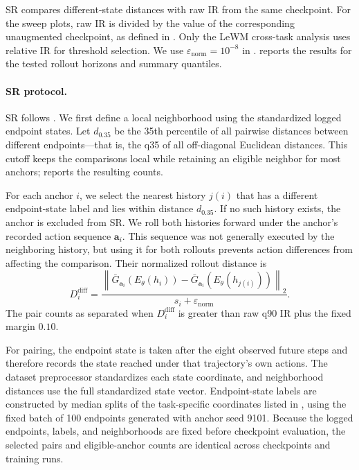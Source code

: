 \documentclass{article}
\begin{document}
SR compares different-state distances with raw IR from the same checkpoint.
For the sweep plots, raw IR is divided by the value of the corresponding
unaugmented checkpoint, as defined in . Only the LeWM
cross-task analysis uses relative IR for threshold selection. We use
$\varepsilon_{\mathrm{norm}}=10^{-8}$ in
.
 reports the results for the tested
rollout horizons and summary quantiles.



\paragraph{SR protocol.}
SR follows . We first define a local neighborhood using the
standardized logged endpoint states. Let $d_{0.35}$ be the 35th percentile of
all pairwise distances between different endpoints---that is, the q35 of all off-diagonal Euclidean distances.
This cutoff keeps the comparisons local while retaining an eligible neighbor for most anchors;
 reports the resulting counts.

For each anchor $i$, we select the nearest history $j(i)$ that has a different
endpoint-state label and lies within distance $d_{0.35}$. If no such history
exists, the anchor is excluded from SR. We roll both histories forward under
the anchor's recorded action sequence $\mathbf a_i$. This sequence was not
generally executed by the neighboring history, but using it for both rollouts
prevents action differences from affecting the comparison. Their normalized
rollout distance is
\begin{equation}
D_i^{\mathrm{diff}}
=
\frac{
\left\|\bar G_{\mathbf a_i}(E_\theta(h_i))
-\bar G_{\mathbf a_i}(E_\theta(h_{j(i)}))\right\|_2
}{s_i+\varepsilon_{\mathrm{norm}}}.
\end{equation}
The pair counts as separated when $D_i^{\mathrm{diff}}$ is greater than raw
q90 IR plus the fixed margin $0.10$.

For pairing, the endpoint state is taken after the eight observed future steps
and therefore records the state reached under that trajectory's own actions.
The dataset preprocessor standardizes each state coordinate, and neighborhood
distances use the full standardized state vector. Endpoint-state labels are
constructed by median splits of the task-specific coordinates listed in
, using the fixed batch of 100 endpoints generated with
anchor seed 9101. Because the logged endpoints, labels, and neighborhoods are
fixed before checkpoint evaluation, the selected pairs and eligible-anchor
counts are identical across checkpoints and training runs.
\end{document}
